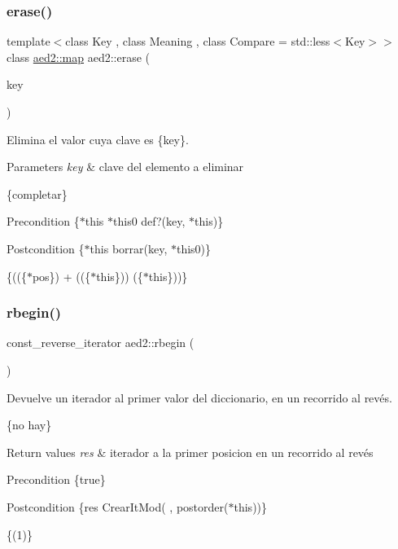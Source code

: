 \subsubsection{\texorpdfstring{erase()}{erase()}}
{\footnotesize\ttfamily template$<$class Key , class Meaning , class Compare  = std\+::less$<$\+Key$>$$>$ \\
class \hyperlink{classaed2_1_1map}{aed2\+::map} aed2\+::erase (\begin{DoxyParamCaption}\item[{const Key \&}]{key }\end{DoxyParamCaption})}



Elimina el valor cuya clave es \{key\}. 


\begin{DoxyParams}{Parameters}
{\em key} & clave del elemento a eliminar\\
\hline
\end{DoxyParams}
\{completar\}

\begin{DoxyPrecond}{Precondition}
\{$\ast$this  $\ast$this0  def?(key, $\ast$this)\} 
\end{DoxyPrecond}
\begin{DoxyPostcond}{Postcondition}
\{$\ast$this  borrar(key, $\ast$this0)\}
\end{DoxyPostcond}
\{((\{$\ast$pos\}) + ((\{$\ast$this\}))  (\{$\ast$this\}))\} \mbox{\label{namespaceaed2_a19713cdc443ce739325238c50f233717}} 
\subsubsection{\texorpdfstring{rbegin()}{rbegin()}}
{\footnotesize\ttfamily const\+\_\+reverse\+\_\+iterator aed2\+::rbegin (\begin{DoxyParamCaption}{ }\end{DoxyParamCaption})}



Devuelve un iterador al primer valor del diccionario, en un recorrido al revés. 

\{no hay\}


\begin{DoxyRetVals}{Return values}
{\em res} & iterador a la primer posicion en un recorrido al revés\\
\hline
\end{DoxyRetVals}
\begin{DoxyPrecond}{Precondition}
\{true\} 
\end{DoxyPrecond}
\begin{DoxyPostcond}{Postcondition}
\{res  Crear\+It\+Mod(  , postorder($\ast$this))\}
\end{DoxyPostcond}
\{(1)\}

